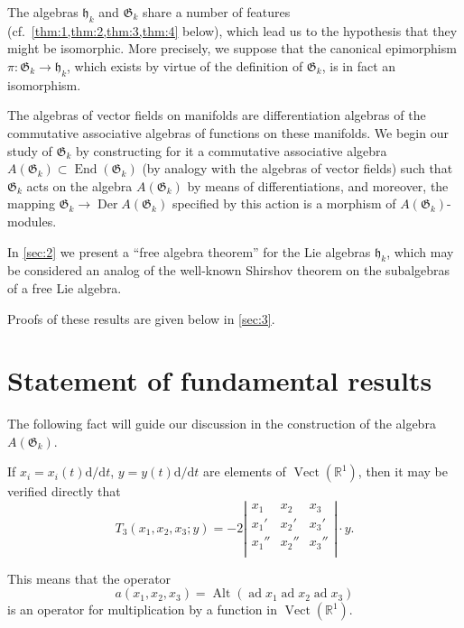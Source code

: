 \documentclass[a4paper]{article}
\newcommand{\R}{\mathbb{R}}
\newcommand{\ad}{\operatorname{ad}}
\newcommand{\Alt}{\operatorname{Alt}}
\newcommand{\Der}{\operatorname{Der}}
\newcommand{\End}{\operatorname{End}}
\newcommand{\Vect}{\operatorname{Vect}}
\begin{document}
The algebras $\mathfrak{h}_k$ and $\mathfrak{G}_k$ share a number of features (cf.\ \cref{thm:1,thm:2,thm:3,thm:4} below), which lead us to the hypothesis that they might be isomorphic.
More precisely, we suppose that the canonical epimorphism $\pi : \mathfrak{G}_k \to \mathfrak{h}_k$, which exists by virtue of the definition of $\mathfrak{G}_k$, is in fact an isomorphism.

The algebras of vector fields on manifolds are differentiation algebras of the commutative associative algebras of functions on these manifolds.
We begin our study of $\mathfrak{G}_k$ by constructing for it a commutative associative algebra $A(\mathfrak{G}_k)\subset \End(\mathfrak{G}_k)$ (by analogy with the algebras of vector fields) such that $\mathfrak{G}_k$ acts on the algebra $A(\mathfrak{G}_k)$ by means of differentiations, and moreover, the mapping $\mathfrak{G}_k \to \Der A(\mathfrak{G}_k)$ specified by this action is a morphism of $A(\mathfrak{G}_k)$-modules.

In \cref{sec:2} we present a ``free algebra theorem'' for the Lie algebras $\mathfrak{h}_k$, which may be considered an analog of the well-known Shirshov theorem \cite{6} on the subalgebras of a free Lie algebra.

Proofs of these results are given below in \cref{sec:3}.

\section{Statement of fundamental results}
\label{sec:1}

The following fact will guide our discussion in the construction of the algebra $A(\mathfrak{G}_k)$.

If $x_i = x_i(t) \mathrm{d}/\mathrm{d} t$, $y = y(t) \mathrm{d}/\mathrm{d} t$ are elements of $\Vect (\R^1)$, then it may be verified directly that 
\begin{equation}
	\label{eq:3}
	T_3(x_1,x_2,x_3;y) = - 2
	\left|
	\begin{matrix}
		x_1 & x_2 & x_3 \\
		x_1' & x_2' & x_3' \\
		x_1'' & x_2'' & x_3'' \\
	\end{matrix}
	\right|
	\cdot y.
\end{equation}

This means that the operator
\begin{equation*}
	a(x_1,x_2,x_3) = \Alt(\ad x_1 \ad x_2 \ad x_3)
\end{equation*}
is an operator for multiplication by a function in $\Vect(\R^1)$.
\end{document}
